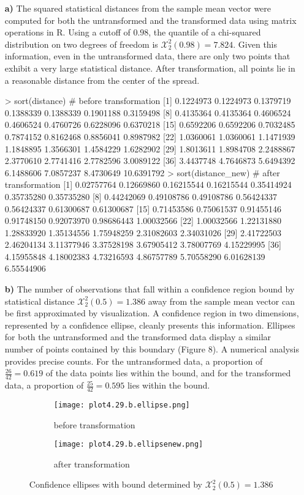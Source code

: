 \begin{enumerate}
	\item[\bf{a)}] The squared statistical distances from the sample mean vector were computed for both the untransformed and the transformed data using matrix operations in R. Using a cutoff of $0.98$, the quantile of a chi-squared distribution on two degrees of freedom is $\mathcal{X}_2^2(0.98)=7.824$. Given this information, even in the untransformed data, there are only two points that exhibit a very large statistical distance. After transformation, all points lie in a reasonable distance from the center of the spread.
\begin{rc}
> sort(distance) # before transformation
 [1]  0.1224973  0.1224973  0.1379719  0.1388339  0.1388339  0.1901188  0.3159498
 [8]  0.4135364  0.4135364  0.4606524  0.4606524  0.4760726  0.6228096  0.6370218
[15]  0.6592206  0.6592206  0.7032485  0.7874152  0.8162468  0.8856041  0.8987982
[22]  1.0360061  1.0360061  1.1471939  1.1848895  1.3566301  1.4584229  1.6282902
[29]  1.8013611  1.8984708  2.2488867  2.3770610  2.7741416  2.7782596  3.0089122
[36]  3.4437748  4.7646873  5.6494392  6.1488606  7.0857237  8.4730649 10.6391792
> sort(distance_new) # after transformation
 [1] 0.02757764 0.12669860 0.16215544 0.16215544 0.35414924 0.35735280 0.35735280
 [8] 0.44242069 0.49108786 0.49108786 0.56424337 0.56424337 0.61300687 0.61300687
[15] 0.71453586 0.75061537 0.91455146 0.91748150 0.92073970 0.98686443 1.00032566
[22] 1.00032566 1.22131880 1.28833920 1.35134556 1.75948259 2.31082603 2.34031026
[29] 2.41722503 2.46204134 3.11377946 3.37528198 3.67905412 3.78007769 4.15229995
[36] 4.15955848 4.18002383 4.73216593 4.86757789 5.70558290 6.01628139 6.55544906
\end{rc}

	\item[\bf{b)}] The number of observations that fall within a confidence region bound by statistical distance $\mathcal{X}_2^2(0.5)=1.386$ away from the sample mean vector can be first approximated by visualization. A confidence region in two dimensions, represented by a confidence ellipse, cleanly presents this information. Ellipses for both the untransformed and the transformed data display a similar number of points contained by this boundary (Figure 8). A numerical analysis provides precise counts. For the untransformed data, a proportion of $\frac{26}{42}=0.619$ of the data points lies within the bound, and for the transformed data, a proportion of $\frac{25}{42} = 0.595$ lies within the bound.
\begin{figure}[H]
\begin{subfigure}{.5\textwidth}
  \centering
  \texttt{[image: plot4.29.b.ellipse.png]}
  \caption{before transformation}
  \label{fig:sfig1}
\end{subfigure}%
\begin{subfigure}{.5\textwidth}
  \centering
	\texttt{[image: plot4.29.b.ellipsenew.png]}
  \caption{after transformation}
  \label{fig:sfig2}
\end{subfigure}
\caption{Confidence ellipses with bound determined by $\mathcal{X}_2^2(0.5)=1.386$}
\end{figure}


\end{enumerate}
